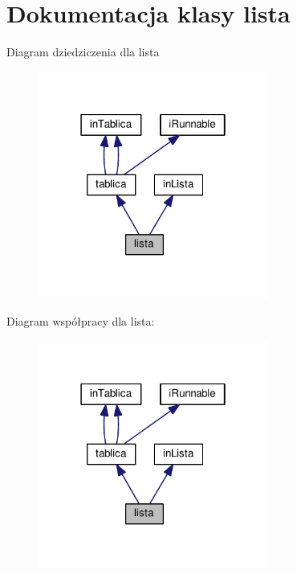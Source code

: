 \section{Dokumentacja klasy lista}
\label{classlista}


Diagram dziedziczenia dla lista
\nopagebreak
\begin{figure}[H]
\begin{center}
\leavevmode
\includegraphics[width=214pt]{classlista__inherit__graph}
\end{center}
\end{figure}


Diagram współpracy dla lista\+:
\nopagebreak
\begin{figure}[H]
\begin{center}
\leavevmode
\includegraphics[width=214pt]{classlista__coll__graph}
\end{center}
\end{figure}
